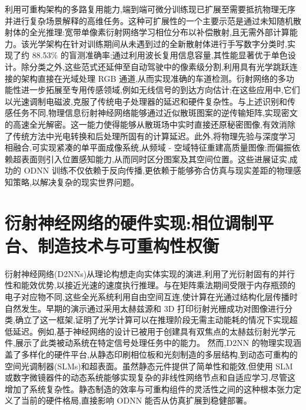 利用可重构架构的多路复用能力,端到端可微分训练现已扩展至需要抵抗物理无序并进行复杂场景解释的高维任务。这种可扩展性的一个主要示范是通过未知随机散射体的全光推理:宽带单像素衍射网络学习相位分布以补偿散射,且无需外部计算能力。该光学架构在针对训练期间从未遇到过的全新散射体进行手写数字分类时,实现了约 88.53\% 的盲测准确率;通过利用波长复用信息容量,其性能显著优于单色设计。除分类之外,这些范式还延伸至自动驾驶中的像素级分割,利用具有光学跳跃连接的架构直接在光域处理 RGB 通道,从而实现准确的车道检测。衍射网络的多功能性进一步拓展至专用传感领域,例如无线信号的到达方向估计;在这些应用中,它们以光速调制电磁波,克服了传统电子处理器的延迟和硬件复杂性。与上述识别和传感任务不同,物理信息衍射神经网络能够通过近似散斑图案的逆传输矩阵,实现密文的高速全光解密。这一能力使得能够从散斑场中实时直接还原秘密图像,有效消除了传统方法中光电转换和后处理所固有的计算延迟。此外,将物理先验与深度学习相融合,可实现紧凑的单平面成像系统,从频域 - 空域特征重建高质量图像;而偏振依赖超表面则引入位置感知能力,从而同时区分图案及其空间位置。这些进展证实,成功的 ODNN 训练不仅依赖于反向传播,更依赖于能够弥合仿真与现实差距的物理感知策略,以解决复杂的现实世界问题。\citep{doi_10_1038_s41377_023_01116_3_aba67a18} \citep{doi_10_48550_arxiv_2602_07717_16cb1c7a} \citep{doi_10_1038_s41377_024_01511_4_2538a27d} \citep{doi_10_1364_oe_579297_3ffb4db0} \citep{doi_10_1117_12_3086084_f1b734fa} \citep{doi_10_1117_1_apn_5_1_016010_3e30c230}

\section{衍射神经网络的硬件实现:相位调制平台、制造技术与可重构性权衡}\label{ux884dux5c04ux795eux7ecfux7f51ux7edcux7684ux786cux4ef6ux5b9eux73b0ux76f8ux4f4dux8c03ux5236ux5e73ux53f0ux5236ux9020ux6280ux672fux4e0eux53efux91cdux6784ux6027ux6743ux8861}

衍射神经网络(D2NNs)从理论构想走向实体实现的演进,利用了光衍射固有的并行性和能效优势,以接近光速的速度执行推理。与在矩阵乘法期间受限于内存瓶颈的电子对应物不同,这些全光系统利用自由空间互连,使计算在光通过结构化层传播时自然发生。早期的演示通过采用太赫兹源和 3D 打印衍射光栅成功对图像进行分类,确立了这一框架,证明了光学计算可以在推理阶段无需主动能耗的情况下实现超低延迟。例如,基于神经网络的设计已被用于创建具有双焦点的太赫兹衍射光学元件,展示了此类被动系统在特定信号处理任务中的能力。 \citep{doi_10_1109_tthz_2023_3344020_a0a550ba} 然而,D2NN 的物理实现涵盖了多样化的硬件平台,从静态印刷相位板和光刻制造的多层结构,到动态可重构的空间光调制器(SLMs)和超表面。虽然静态元件提供了简单性和能效,但使用 SLM 或数字微镜器件的动态系统能够实现复杂的非线性网络节点和自适应学习,尽管这增加了系统复杂性。静态制造的效率与可重构组件的灵活性之间的这种根本张力定义了当前的硬件格局,直接影响 ODNN 能否从仿真扩展到稳健部署。 \citep{doi_10_1155_2021_6667495_60f04b14} \citep{doi_10_1364_josab_497148_b087424b}

